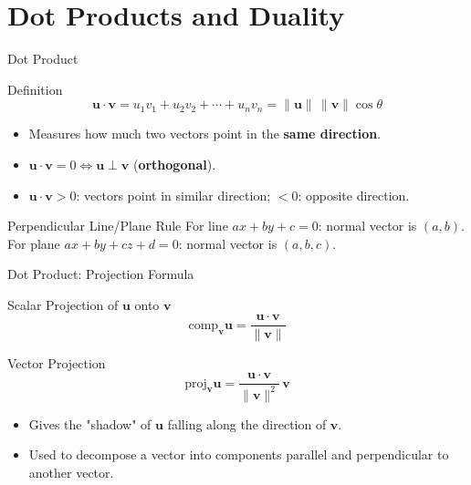 \documentclass[9pt,aspectratio=169]{beamer}
\newcommand{\vect}[1]{\mathbf{#1}}
\begin{document}
\section{Dot Products and Duality}

\begin{frame}{Dot Product}
\begin{block}{Definition}
$$\vect{u}\cdot \vect{v} = u_1v_1+u_2v_2+\cdots+u_nv_n = \|\vect{u}\|\,\|\vect{v}\|\cos\theta$$
\end{block}
\begin{itemize}
\item Measures how much two vectors point in the \textbf{same direction}.
\item $\vect{u}\cdot\vect{v} = 0 \iff \vect{u} \perp \vect{v}$ (\textbf{orthogonal}).
\item $\vect{u}\cdot\vect{v} > 0$: vectors point in similar direction; $<0$: opposite direction.
\end{itemize}
\begin{alertblock}{Perpendicular Line/Plane Rule}
For line $ax+by+c=0$: normal vector is $(a,b)$. \\
For plane $ax+by+cz+d=0$: normal vector is $(a,b,c)$.
\end{alertblock}
\end{frame}

\begin{frame}{Dot Product: Projection Formula}
\begin{block}{Scalar Projection of $\vect{u}$ onto $\vect{v}$}
$$\text{comp}_{\vect{v}}\vect{u} = \frac{\vect{u}\cdot\vect{v}}{\|\vect{v}\|}$$
\end{block}
\begin{block}{Vector Projection}
$$\text{proj}_{\vect{v}}\vect{u} = \frac{\vect{u}\cdot\vect{v}}{\|\vect{v}\|^2}\,\vect{v}$$
\end{block}
\begin{itemize}
\item Gives the "shadow" of $\vect{u}$ falling along the direction of $\vect{v}$.
\item Used to decompose a vector into components parallel and perpendicular to another vector.
\end{itemize}
\end{frame}
\end{document}
